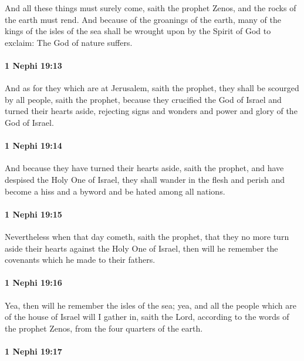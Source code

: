 			And all these things must surely come, saith the prophet Zenos,
			and the rocks of the earth must rend.
			And because of the groanings of the earth,
			many of the kings of the isles of the sea
			shall be wrought upon by the Spirit of God to exclaim:
			The God of nature suffers.

		\paragraph{1 Nephi 19:13} %
			\label{1NEPHI-19-13}

			And as for they which are at Jerusalem, saith the prophet,
			they shall be scourged by all people, saith the prophet,
			because they crucified the God of Israel and turned their hearts aside,
			rejecting signs and wonders and power and glory of the God of Israel.

		\paragraph{1 Nephi 19:14} %
			\label{1NEPHI-19-14}

			And because they have turned their hearts aside, saith the prophet,
			and have despised the Holy One of Israel,
			they shall wander in the flesh and perish
			and become a hiss and a byword and be hated among all nations.

		\paragraph{1 Nephi 19:15} %
			\label{1NEPHI-19-15}

			Nevertheless when that day cometh, saith the prophet,
			that they no more turn aside their hearts against the Holy One of Israel,
			then will he remember the covenants which he made to their fathers.

		\paragraph{1 Nephi 19:16} %
			\label{1NEPHI-19-16}

			Yea, then will he remember the isles of the sea;
			yea, and all the people which are of the house of Israel
			will I gather in, saith the Lord,
			according to the words of the prophet Zenos,
			from the four quarters of the earth.

		\paragraph{1 Nephi 19:17} %
			\label{1NEPHI-19-17}


